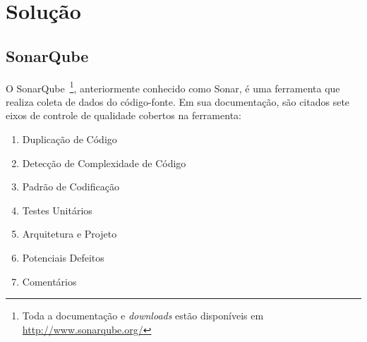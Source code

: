 \chapter{Solução}

\section{SonarQube}
O SonarQube~\footnote{Toda a documentação e \textit{downloads} estão disponíveis
em \url{http://www.sonarqube.org/}}, anteriormente conhecido como Sonar, é uma 
ferramenta que realiza coleta de dados do código-fonte. Em sua documentação, 
são citados sete eixos de controle de qualidade cobertos na ferramenta: 

\begin{enumerate}
\item Duplicação de Código
\item Detecção de Complexidade de Código
\item Padrão de Codificação
\item Testes Unitários
\item Arquitetura e Projeto
\item Potenciais Defeitos
\item Comentários
\end{enumerate}

